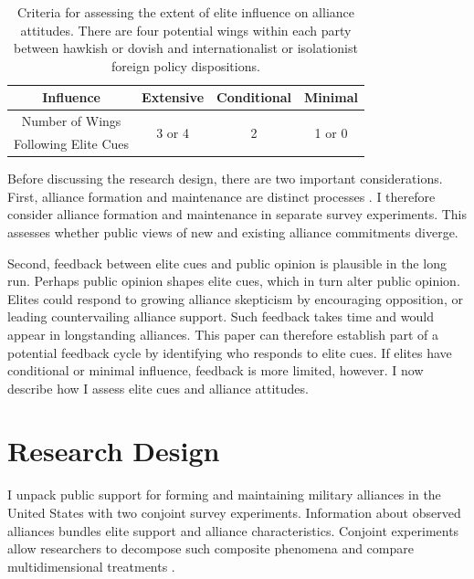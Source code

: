 \documentclass[12pt]{article}
\begin{document}
\begin{table}[hbt!]
\begin{center}
\begin{tabular}{| c | c | c | c |}
\hline
   Influence          & Extensive & Conditional & Minimal  \\
\hline
   Number of Wings   & \multirow{2}{*}{3 or 4}  & \multirow{2}{*}{2}  & \multirow{2}{*}{1 or 0} \\
   Following Elite Cues     &           &             &  \\
\hline
\end{tabular}
\caption{Criteria for assessing the extent of elite influence on alliance attitudes. There are four potential wings within each party between hawkish or dovish and internationalist or isolationist foreign policy dispositions.}
\label{tab:arg-sum}
\end{center} 
\end{table}



Before discussing the research design, there are two important considerations. 
First, alliance formation and maintenance are distinct processes \citep{Snyder1997}. 
I therefore consider alliance formation and maintenance in separate survey experiments.
This assesses whether public views of new and existing alliance commitments diverge. 


Second, feedback between elite cues and public opinion is plausible in the long run. 
Perhaps public opinion shapes elite cues, which in turn alter public opinion. 
Elites could respond to growing alliance skepticism by encouraging opposition, or leading countervailing alliance support.
Such feedback takes time and would appear in longstanding alliances.
This paper can therefore establish part of a potential feedback cycle by identifying who responds to elite cues.  
If elites have conditional or minimal influence, feedback is more limited, however.
I now describe how I assess elite cues and alliance attitudes. 



\section{Research Design}



I unpack public support for forming and maintaining military alliances in the United States with two conjoint survey experiments. 
Information about observed alliances bundles elite support and alliance characteristics. 
Conjoint experiments allow researchers to decompose such composite phenomena and compare multidimensional treatments \citep{Hainmuelleretal2014}. 
\end{document}

